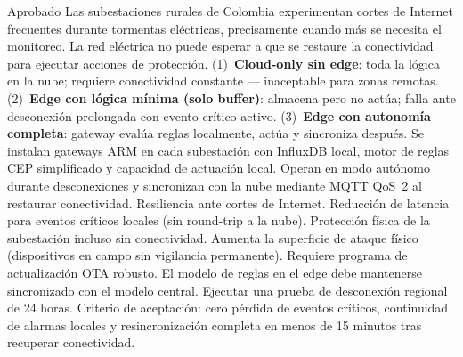 \documentclass[12pt, letterpaper]{article}
\begin{document}
  {Aprobado}
  {Las subestaciones rurales de Colombia experimentan cortes de Internet frecuentes
   durante tormentas eléctricas, precisamente cuando más se necesita el monitoreo. La
   red eléctrica no puede esperar a que se restaure la conectividad para ejecutar
   acciones de protección.}
  {(1)~\textbf{Cloud-only sin edge}: toda la lógica en la nube; requiere conectividad
   constante --- inaceptable para zonas remotas.
   (2)~\textbf{Edge con lógica mínima (solo buffer)}: almacena pero no actúa; falla
   ante desconexión prolongada con evento crítico activo.
   (3)~\textbf{Edge con autonomía completa}: gateway evalúa reglas localmente, actúa
   y sincroniza después.}
  {Se instalan gateways ARM en cada subestación con InfluxDB local, motor de reglas
   CEP simplificado y capacidad de actuación local. Operan en modo autónomo durante
   desconexiones y sincronizan con la nube mediante MQTT QoS~2 al restaurar
   conectividad.}
  {Resiliencia ante cortes de Internet. Reducción de latencia para eventos críticos
   locales (sin round-trip a la nube). Protección física de la subestación incluso
   sin conectividad.}
  {Aumenta la superficie de ataque físico (dispositivos en campo sin vigilancia
   permanente). Requiere programa de actualización OTA robusto. El modelo de reglas
    en el edge debe mantenerse sincronizado con el modelo central.}
    {Ejecutar una prueba de desconexión regional de 24 horas. Criterio de aceptación:
    cero pérdida de eventos críticos, continuidad de alarmas locales y
    resincronización completa en menos de 15 minutos tras recuperar conectividad.}
\end{document}
